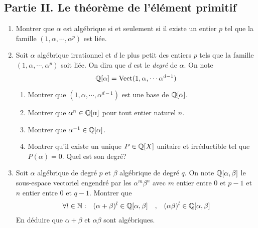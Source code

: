 \subsection*{Partie II. Le théorème de l'élément primitif}
\begin{enumerate}
\item Montrer que $\alpha$ est algébrique si et seulement si il existe un entier $p$ tel que la famille $(1,\alpha, \cdots ,\alpha^p)$ est liée.
\item Soit $\alpha$ algébrique irrationnel et $d$ le plus petit des entiers $p$ tels que la famille $(1,\alpha, \cdots ,\alpha^p)$ soit liée. On dira que $d$ est le \emph{degré} de $\alpha$. On note
\begin{displaymath}
\mathbb{Q} [\alpha]=\operatorname{Vect}(1,\alpha, \cdots \alpha^{d-1}) 
\end{displaymath}
  \begin{enumerate}
  \item Montrer que $(1,\alpha, \cdots ,\alpha^{d-1})$ est une base de $\mathbb{Q}[\alpha]$.
  \item Montrer que $\alpha^n\in \mathbb{Q}[\alpha]$ pour tout entier naturel $n$.
  \item Montrer que $\alpha^{-1}\in \mathbb{Q}[\alpha]$.
  \item Montrer qu'il existe un unique $P\in \mathbb{Q}[X]$ unitaire et irréductible tel que $P(\alpha)=0$. Quel est son degré?
  \end{enumerate}
  \item Soit $\alpha$ algébrique de degré $p$ et $\beta$ algébrique de degré $q$.\newline
On note $\mathbb{Q}[\alpha,\beta]$ le sous-espace vectoriel engendré par les $\alpha^m \beta^n$ avec $m$ entier entre 0 et $p-1$ et $n$ entier entre 0 et $q-1$. Montrer que 
\begin{align*}
 \forall l \in \mathbb{N} :& &  (\alpha+\beta)^l \in \mathbb{Q}[\alpha,\beta] & & , & & (\alpha\beta)^l \in \mathbb{Q}[\alpha,\beta]
\end{align*}
En déduire que $\alpha + \beta$ et $\alpha \beta$ sont algébriques.
\end{enumerate}

